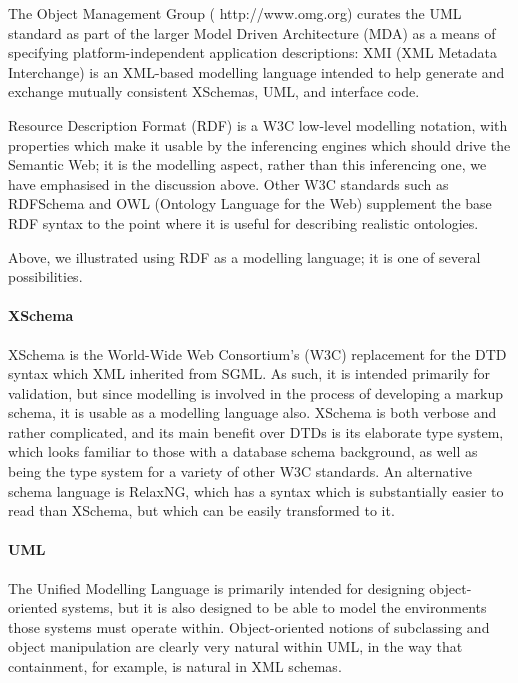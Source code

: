 \documentclass[11pt,twoside]{article}
\begin{document}
The Object Management Group (
{http://www.omg.org}) curates the UML standard as part of the larger
Model Driven Architecture (MDA) as a means of specifying
platform-independent application descriptions: XMI (XML Metadata
Interchange) is an XML-based modelling language intended to help
generate and exchange mutually consistent XSchemas, UML, and interface code.

Resource Description Format (RDF) is a W3C low-level
modelling notation, with properties which make it usable by the
inferencing engines which should drive the Semantic Web;
it is the modelling aspect, rather than this inferencing one, we
have emphasised in the discussion above.  Other W3C standards such as
RDFSchema and OWL (Ontology Language for the Web) supplement the base
RDF syntax to the point where it is useful for describing realistic
ontologies.


\iffalse
Above, we illustrated using RDF as a modelling language; it is one of
several possibilities.

\paragraph{XSchema}

XSchema is the World-Wide Web Consortium's (W3C) replacement for the
DTD syntax which XML inherited from SGML.  As such, it is intended
primarily for validation, but since modelling is involved in the
process of developing a markup schema, it is usable as a modelling
language also.  XSchema is both verbose and rather complicated, and
its main benefit over DTDs is its elaborate type system, which looks
familiar to those with a database schema background, as well as being
the type system for a variety of other W3C standards.  An alternative
schema language is RelaxNG, which has a syntax which is substantially
easier to read than XSchema, but which can be easily transformed to
it.

\paragraph{UML}

The Unified Modelling Language is primarily intended for designing
object-oriented systems, but it is also designed to be able to model the
environments those systems must operate within.  Object-oriented notions
of subclassing and object manipulation are clearly very natural within
UML, in the way that containment, for example, is natural in XML schemas.
\end{document}

